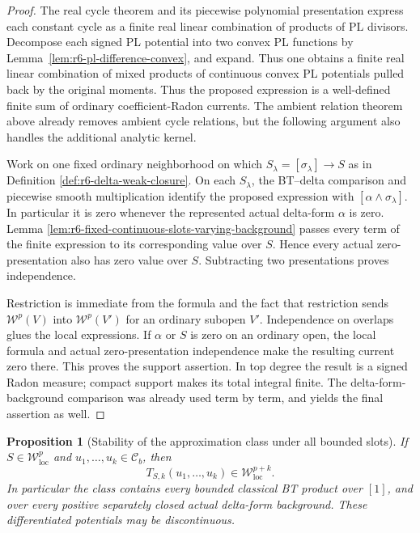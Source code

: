 \documentclass[11pt,a4paper]{article}
\numberwithin{equation}{section}
\newtheorem{proposition}[theorem]{Proposition}
\theoremstyle{definition}
\theoremstyle{remark}
\begin{document}
\begin{proof}
The real cycle theorem and its piecewise polynomial
presentation express each constant cycle as a finite
real linear combination of products of PL divisors.
Decompose each signed PL potential into two convex PL
functions by Lemma~\ref{lem:r6-pl-difference-convex},
and expand. Thus one obtains a finite real linear
combination of mixed products of continuous convex PL
potentials pulled back by the original moments.
Thus the proposed expression is a well-defined finite
sum of ordinary coefficient-Radon currents. The ambient
relation theorem above already removes ambient cycle
relations, but the following argument also handles the
additional analytic kernel.

Work on one fixed ordinary neighborhood on which
$S_\lambda=[\sigma_\lambda]\to S$ as in Definition
\ref{def:r6-delta-weak-closure}. On each $S_\lambda$, the
BT--delta comparison and piecewise smooth multiplication
identify the proposed expression with
$[\alpha\wedge\sigma_\lambda]$. In particular it is zero
whenever the represented actual delta-form $\alpha$ is
zero. Lemma
\ref{lem:r6-fixed-continuous-slots-varying-background}
passes every term of the finite expression to its
corresponding value over $S$. Hence every actual
zero-presentation also has zero value over $S$.
Subtracting two presentations proves independence.

Restriction is immediate from the formula and the fact
that restriction sends $\mathcal W^p(V)$ into
$\mathcal W^p(V')$ for an ordinary subopen $V'$.
Independence on overlaps glues the local expressions.
If $\alpha$ or $S$ is zero on an ordinary open, the local
formula and actual zero-presentation independence make
the resulting current zero there. This proves the support
assertion. In top degree the result is a signed Radon
measure; compact support makes its total integral finite.
The delta-form-background comparison was already used
term by term, and yields the final assertion as well.
\end{proof}

\begin{proposition}[Stability of the approximation class under all bounded slots]
\label{prop:r6-delta-weak-class-bt-stability}
If $S\in\mathcal W^p_{\mathrm{loc}}$ and
$u_1,\ldots,u_k\in\mathcal C_b$, then
\[
                  T_{S,k}(u_1,\ldots,u_k)
                        \in\mathcal W^{p+k}_{\mathrm{loc}}.
\]
In particular the class contains every bounded classical
BT product over $[1]$, and over every positive separately
closed actual delta-form background. These differentiated
potentials may be discontinuous.
\end{proposition}
\end{document}
